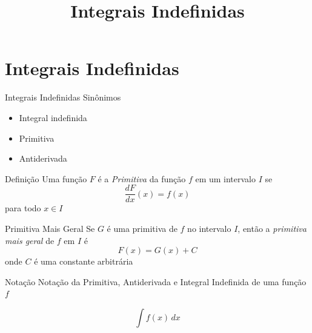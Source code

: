 
\usepackage{integracao_e_series}

\title{Integrais Indefinidas}



\addtitle

\section{Integrais Indefinidas}

\begin{frame}{Integrais Indefinidas}
  Sinônimos
  \begin{itemize}[<+->]
    \item Integral indefinida
    \item Primitiva
    \item Antiderivada
  \end{itemize}
\end{frame}

\begin{frame}{Definição}
  Uma função $F$ é a \emph{Primitiva} da função $f$
  \pause
  em um intervalo $I$
  \pause
  se
  \[
    \frac{dF}{dx}(x) = f(x)
  \]
  \pause
  para todo $x\in I$
\end{frame}

\begin{frame}{Primitiva Mais Geral}
  Se $G$ é uma primitiva de $f$ no intervalo $I$,
  \pause
  então a \emph{primitiva mais geral} de $f$ em $I$
  \pause
  é
  \[
    F(x) = G(x) + C
  \]
  onde $C$ é uma constante arbitrária
\end{frame}

\begin{frame}{Notação}
  Notação da Primitiva, Antiderivada e Integral Indefinida de uma função $f$

  \[
    \int f(x) \, dx
  \]
\end{frame}

